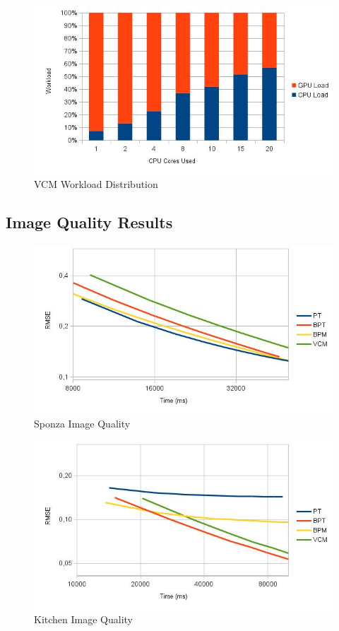 \begin{figure}[H]
\includegraphics[width=\linewidth]{img/vcmwl.jpg}
\caption{\label{img:vcmwl} VCM Workload Distribution}
\end{figure}

\subsection{Image Quality Results}

\begin{figure}[H]
\includegraphics[width=\linewidth]{img/sponzaImgq.jpg}
\caption{\label{img:sponzaImgq} Sponza Image Quality}
\end{figure}

\begin{figure}[H]
\includegraphics[width=\linewidth]{img/kitchenImgq.jpg}
\caption{\label{img:kitchenImgq} Kitchen Image Quality}
\end{figure}

